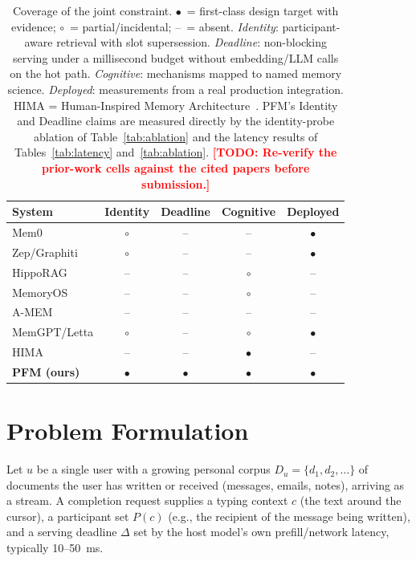 \documentclass[letterpaper]{article}
\newcommand{\todo}[1]{\textbf{\textcolor{red}{[TODO: #1]}}}
\newcommand{\Du}{D_u}
\newcommand{\deadline}{\Delta}
\begin{document}
\begin{table}[t]
\centering
\small
\begin{tabular}{@{}lcccc@{}}
\toprule
System & Identity & Deadline & Cognitive & Deployed \\
\midrule
Mem0                & \(\circ\) & --        & --        & \(\bullet\) \\
Zep/Graphiti        & \(\circ\) & --        & --        & \(\bullet\) \\
HippoRAG            & --        & --        & \(\circ\) & --          \\
MemoryOS            & --        & --        & \(\circ\) & --          \\
A-MEM               & --        & --        & --        & --          \\
MemGPT/Letta        & \(\circ\) & --        & \(\circ\) & \(\bullet\) \\
HIMA                & --        & --        & \(\bullet\) & --        \\
\midrule
\textbf{PFM (ours)} & \(\bullet\) & \(\bullet\) & \(\bullet\) & \(\bullet\) \\
\bottomrule
\end{tabular}
\caption{Coverage of the joint constraint.
\(\bullet\)~= first-class design target with evidence;
\(\circ\)~= partial/incidental; --~= absent.
\emph{Identity}: participant-aware retrieval with slot supersession.
\emph{Deadline}: non-blocking serving under a millisecond budget without
embedding/LLM calls on the hot path. \emph{Cognitive}: mechanisms mapped
to named memory science. \emph{Deployed}: measurements from a real
production integration. HIMA = Human-Inspired Memory
Architecture~\citep{kerestecioglu2026human}. PFM's Identity and Deadline
claims are measured directly by the identity-probe ablation of
Table~\ref{tab:ablation} and the latency results of
Tables~\ref{tab:latency} and~\ref{tab:ablation}.
\todo{Re-verify the prior-work cells against the cited papers before
submission.}}
\label{tab:comparison}
\end{table}

\section{Problem Formulation}

Let $u$ be a single user with a growing personal corpus
$\Du = \{d_1, d_2, \dots\}$ of documents the user has written or
received (messages, emails, notes), arriving as a stream. A completion
request supplies a typing context $c$ (the text around the cursor), a
participant set $P(c)$ (e.g., the recipient of the message being
written), and a serving deadline $\deadline$ set by the host model's own
prefill/network latency, typically 10--50~ms.
\end{document}
